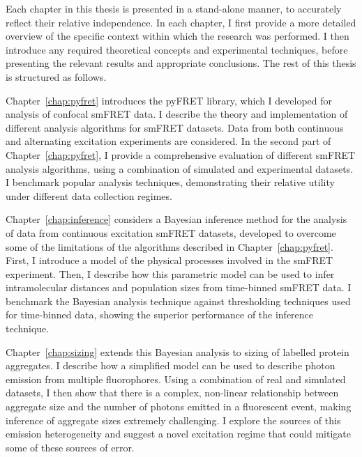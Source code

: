 Each chapter in this thesis is presented in a stand-alone manner, to accurately reflect their relative independence. In each chapter, I first provide a more detailed overview of the specific context within which the research was performed. I then introduce any required theoretical concepts and experimental techniques, before presenting the relevant results and appropriate conclusions. The rest of this thesis is structured as follows.

Chapter~\ref{chap:pyfret} introduces the pyFRET library, which I developed for analysis of confocal smFRET data. I describe the theory and implementation of different analysis algorithms for smFRET datasets. Data from both continuous and alternating excitation experiments are considered. In the second part of Chapter~\ref{chap:pyfret}, I provide a comprehensive evaluation of different smFRET analysis algorithms, using a combination of simulated and experimental datasets. I benchmark popular analysis techniques, demonstrating their relative utility under different data collection regimes. 


Chapter~\ref{chap:inference} considers a Bayesian inference method for the analysis of data from continuous excitation smFRET datasets, developed to overcome some of the limitations of the algorithms described in Chapter~\ref{chap:pyfret}. First, I introduce a model of the physical processes involved in the smFRET experiment. Then, I describe how this parametric model can be used to infer intramolecular distances and population sizes from time-binned smFRET data. I benchmark the Bayesian analysis technique against thresholding techniques used for time-binned data, showing the superior performance of the inference technique.

Chapter~\ref{chap:sizing} extends this Bayesian analysis to sizing of labelled protein aggregates. I describe how a simplified model can be used to describe photon emission from multiple fluorophores. Using a combination of real and simulated datasets, I then show that there is a complex, non-linear relationship between aggregate size and the number of photons emitted in a fluorescent event, making inference of aggregate sizes extremely challenging. I explore the sources of this emission heterogeneity and suggest a novel excitation regime that could mitigate some of these sources of error.

